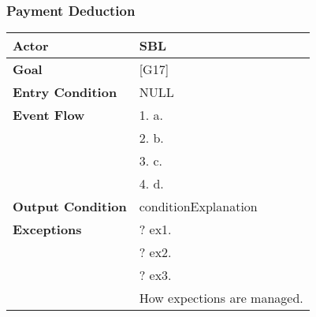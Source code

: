 \subsubsection{Payment Deduction}
\begin{tabular}{| l | p{8cm} |}
\hline
\textbf{Actor}      &       SBL \\
\hline
\textbf{Goal}       &       [G17]\\
\hline
\textbf{Entry Condition} &  NULL\\
\hline
\textbf{Event Flow}     &   1.	a.\\&
                                            2.	b.\\&
                                            3.	c.\\&
                                            4.  d.\\
\hline
\textbf{Output Condition} & conditionExplanation\\
\hline
\textbf{Exceptions} &       ?   ex1.\\& 
                            ?	ex2.\\&
                            ?	ex3.\\& 
                           How expections are managed.\\
\hline
\end{tabular} 